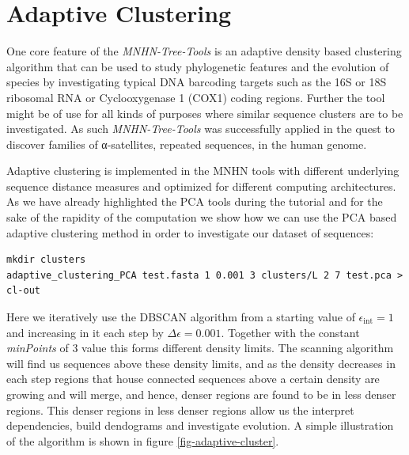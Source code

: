 \section{Adaptive Clustering}

One core feature of the \emph{MNHN-Tree-Tools} is an adaptive density
based clustering algorithm that can be used to study phylogenetic
features and the evolution of species by investigating typical
DNA barcoding targets such as the 16S or 18S ribosomal RNA or
Cyclooxygenase 1 (COX1) coding regions. Further the tool might be of
use for all kinds of purposes where similar sequence clusters are to
be investigated. As such \emph{MNHN-Tree-Tools}
was successfully applied in the quest to discover families of
α-satellites, repeated sequences, in the human genome.

Adaptive clustering is implemented in the MNHN tools with different underlying
sequence distance measures and optimized for different computing
architectures. As we have already highlighted the PCA tools during the
tutorial and for the sake of the rapidity of the computation we show
how we can use the PCA based adaptive clustering method in order to
investigate our dataset of sequences:
\begin{lstlisting}
mkdir clusters
adaptive_clustering_PCA test.fasta 1 0.001 3 clusters/L 2 7 test.pca > cl-out
\end{lstlisting}
Here we iteratively use the DBSCAN algorithm \cite{dbscan} from a
starting value of $\epsilon_{\mathrm{int}} = 1$ and increasing in it
each step by $\Delta\epsilon = 0.001$. Together with the constant
\emph{minPoints} of 3 value this forms different density limits. The
scanning algorithm will find us sequences above these density limits,
and as the density decreases in each step regions that house connected
sequences above a certain density are growing and will merge, and
hence, denser regions are found to be in less denser regions. This
denser regions in less denser regions allow us the interpret
dependencies, build dendograms and investigate evolution. A simple
illustration of the algorithm is shown in figure
\ref{fig-adaptive-cluster}.
